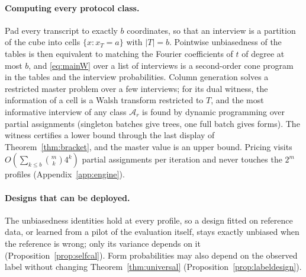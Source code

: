 \documentclass{article}
\newcommand{\A}{\mathcal A}
\begin{document}
\paragraph{Computing every protocol class.}
Pad every transcript to exactly $b$ coordinates, so that an interview is a partition of the cube into cells $\{x:x_T=a\}$ with $|T|=b$. Pointwise unbiasedness of the tables is then equivalent to matching the Fourier coefficients of $t$ of degree at most $b$, and \eqref{eq:mainW} over a list of interviews is a second-order cone program in the tables and the interview probabilities. Column generation solves a restricted master problem over a few interviews; for its dual witness, the information of a cell is a Walsh transform restricted to $T$, and the most informative interview of any class $\A_r$ is found by dynamic programming over partial assignments (singleton batches give trees, one full batch gives forms). The witness certifies a lower bound through the last display of Theorem~\ref{thm:bracket}, and the master value is an upper bound. Pricing visits $O(\sum_{k\le b}\binom mk4^k)$ partial assignments per iteration and never touches the $2^m$ profiles (Appendix~\ref{app:engine}).

\paragraph{Designs that can be deployed.}
The unbiasedness identities hold at every profile, so a design fitted on reference data, or learned from a pilot of the evaluation itself, stays exactly unbiased when the reference is wrong; only its variance depends on it (Proposition~\ref{prop:selfcal}). Form probabilities may also depend on the observed label without changing Theorem~\ref{thm:universal} (Proposition~\ref{prop:labeldesign}).
\end{document}
